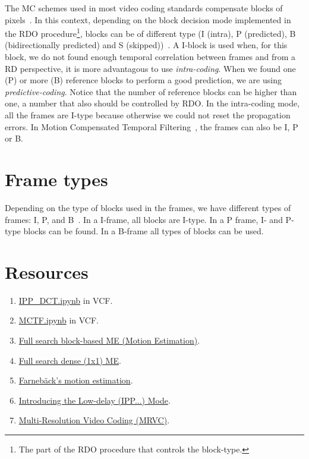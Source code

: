 The MC schemes used in most video coding standards compensate blocks
of pixels~\cite{vruiz__ME}. In this context, depending on the block
decision mode implemented in the RDO procedure\footnote{The part of
the RDO procedure that controls the block-type.}, blocks can be of
different type (I (intra), P (predicted), B (bidirectionally
predicted) and S (skipped))~\cite{vruiz__MC}. A I-block is used when,
for this block, we do not found enough temporal correlation between
frames and from a RD perspective, it is more advantagous to use
\emph{intra-coding}. When we found one (P) or more (B) reference
blocks to perform a good prediction, we are using
\emph{predictive-coding}. Notice that the number of reference blocks
can be higher than one, a number that also should be controlled by
RDO. In the intra-coding mode, all the frames are I-type because
otherwise we could not reset the propagation errors. In Motion
Compensated Temporal Filtering~\cite{vruiz__MCTF}, the frames can also
be I, P or B.

\section{Frame types}

Depending on the type of blocks used in the frames, we have different
types of frames: I, P, and B~\cite{vruiz__MC}. In a I-frame, all
blocks are I-type. In a P frame, I- and P-type blocks can be found. In
a B-frame all types of blocks can be used.

\section{Resources}
\begin{enumerate}
\item \href{https://github.com/Sistemas-Multimedia/VCF/blob/main/notebooks/IPP_DCT.ipynb}{IPP\_DCT.ipynb} in VCF.
\item \href{https://github.com/Sistemas-Multimedia/VCF/blob/main/notebooks/MCTF.ipynb}{MCTF.ipynb} in VCF.
\item \href{https://github.com/vicente-gonzalez-ruiz/motion_estimation/blob/main/src/motion_estimation/full_search_block_ME.ipynb}{Full search block-based ME (Motion Estimation)}.
\item \href{https://github.com/vicente-gonzalez-ruiz/motion_estimation/blob/main/src/motion_estimation/full_search_dense_ME.ipynb}{Full search dense (1x1) ME}.
\item \href{https://github.com/vicente-gonzalez-ruiz/motion_estimation/blob/main/src/motion_estimation/farneback_ME.ipynb}{Farnebäck's motion estimation}.
\item \href{https://github.com/vicente-gonzalez-ruiz/motion_compensation/blob/master/introducing_IPPP.ipynb}{Introducing the Low-delay (IPP...) Mode}.
\item \href{https://github.com/Sistemas-Multimedia/MRVC}{Multi-Resolution Video Coding (MRVC)}.
\end{enumerate}

